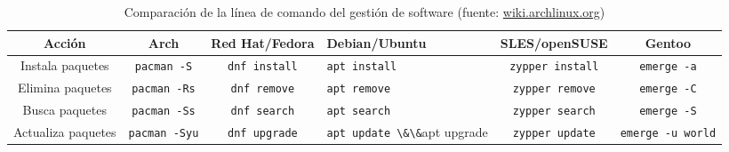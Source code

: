 \documentclass[
	spanish,
	10pt,
	xcolor=table,
	handout,
	aspectratio=1610,
  ignorenonframetext
]{beamer}
\begin{document}
\begin{frame}
  \begin{table}[ht!]
    \caption{Comparación de la línea de comando del gestión de software (fuente: \url{wiki.archlinux.org})}
    \centering\footnotesize
    \begin{tabular}{cccp{50pt}cc}
      \toprule
      Acción             & Arch                    & Red Hat/Fedora          & Debian/Ubuntu                               & SLES/openSUSE           & Gentoo
      \tabularnewline
      \midrule
      Instala paquetes   & \lstinline|pacman -S|  & \lstinline|dnf install|  & \lstinline|apt install|                      & \lstinline|zypper install|  & \lstinline|emerge -a|
      \tabularnewline
      Elimina paquetes   & \lstinline|pacman -Rs|  & \lstinline|dnf remove|  & \lstinline|apt remove|                      & \lstinline|zypper remove|  & \lstinline|emerge -C|
      \tabularnewline
      Busca paquetes     & \lstinline|pacman -Ss| & \lstinline|dnf search| & \lstinline|apt search|                     & \lstinline|zypper search| & \lstinline|emerge -S|
      \tabularnewline
      Actualiza paquetes & \lstinline|pacman -Syu| & \lstinline|dnf upgrade| & \lstinline|apt update \&\&|\newline apt upgrade & \lstinline|zypper update| & \lstinline|emerge -u world|
      \tabularnewline
      \bottomrule
    \end{tabular}
  \end{table}

\end{frame}
\end{document}

